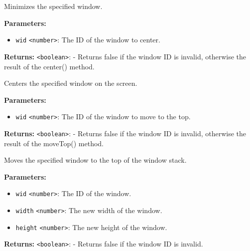 \documentclass[12pt,a4paper]{article}
\begin{document}
\noindent Minimizes the specified window.

\vspace{5mm}
\noindent {}


\noindent \textbf{Parameters:}
\begin{itemize}
  \item \texttt{wid} \texttt{<number>}: The ID of the window to center.
\end{itemize}

\noindent \textbf{Returns:} \texttt{<boolean>}: - Returns false if the window ID is invalid, otherwise the result of the center() method.

\noindent Centers the specified window on the screen.

\vspace{5mm}
\noindent {}


\noindent \textbf{Parameters:}
\begin{itemize}
  \item \texttt{wid} \texttt{<number>}: The ID of the window to move to the top.
\end{itemize}

\noindent \textbf{Returns:} \texttt{<boolean>}: - Returns false if the window ID is invalid, otherwise the result of the moveTop() method.

\noindent Moves the specified window to the top of the window stack.

\vspace{5mm}
\noindent {}


\noindent \textbf{Parameters:}
\begin{itemize}
  \item \texttt{wid} \texttt{<number>}: The ID of the window.
  \item \texttt{width} \texttt{<number>}: The new width of the window.
  \item \texttt{height} \texttt{<number>}: The new height of the window.
\end{itemize}

\noindent \textbf{Returns:} \texttt{<boolean>}: - Returns false if the window ID is invalid.
\end{document}
